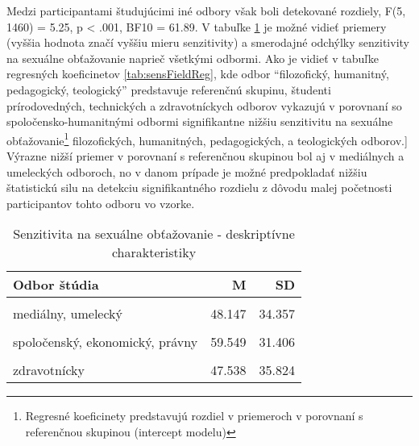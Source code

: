 \documentclass[
]{article}
\begin{document}
Medzi participantami študujúcimi iné odbory však boli detekované rozdiely, F(5, 1460) = 5.25, p \textless{} .001, BF10 = 61.89. V tabuľke \ref{tab:sensField} je možné vidieť priemery (vyššia hodnota značí vyššiu mieru senzitivity) a smerodajné odchýlky senzitivity na sexuálne obťažovanie naprieč všetkými odbormi. Ako je vidieť v tabuľke regresných koeficinetov \ref{tab:sensFieldReg}, kde odbor ``filozofický, humanitný, pedagogický, teologický'' predstavuje referenčnú skupinu, študenti prírodovedných, technických a zdravotníckych odborov vykazujú v porovnaní so spoločensko-humanitnými odbormi signifikantne nižšiu senzitivitu na sexuálne obťažovanie\footnote{Regresné koeficinety predstavujú rozdiel v priemeroch v porovnaní s referenčnou skupinou (intercept modelu)} filozofických, humanitných, pedagogických, a teologických odborov.{]} Výrazne nižší priemer v porovnaní s referenčnou skupinou bol aj v mediálnych a umeleckých odboroch, no v danom prípade je možné predpokladať nižšiu štatistickú silu na detekciu signifikantného rozdielu z dôvodu malej početnosti participantov tohto odboru vo vzorke.

\begin{table}[H]

\caption{\label{tab:sensField}Senzitivita na sexuálne obťažovanie - deskriptívne charakteristiky}
\centering
\fontsize{10}{12}\selectfont
\begin{tabular}[t]{lrr}
\toprule
Odbor štúdia & M & SD\\
\midrule
\cellcolor{gray!6}{filozofický, humanitný, pedagogický, teologický} & \cellcolor{gray!6}{56.803} & \cellcolor{gray!6}{34.414}\\
mediálny, umelecký & 48.147 & 34.357\\
\cellcolor{gray!6}{prírodovedecký} & \cellcolor{gray!6}{45.857} & \cellcolor{gray!6}{34.586}\\
spoločenský, ekonomický, právny & 59.549 & 31.406\\
\cellcolor{gray!6}{technický} & \cellcolor{gray!6}{51.165} & \cellcolor{gray!6}{33.818}\\
\addlinespace
zdravotnícky & 47.538 & 35.824\\
\bottomrule
\end{tabular}
\end{table}
\end{document}
